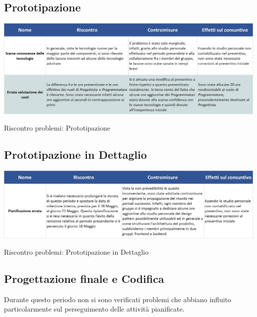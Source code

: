 \subsection{Prototipazione}
\begin{table}[h!]
	\centerline{\includegraphics[scale=0.55]{img/Rischi/RiscontroProblemi-Prototipazione.jpg}}
	\caption{Riscontro problemi: Prototipazione}
\end{table}

\subsection{Prototipazione in Dettaglio} \label{RiscontroPrototipazioneDettaglio}
\begin{table}[h!]
	\centerline{\includegraphics[scale=0.55]{img/Rischi/RiscontroProblemi-PrototipazioneDettaglio.jpg}}
	\caption{Riscontro problemi: Prototipazione in Dettaglio}
\end{table}

\subsection{Progettazione finale e Codifica}
Durante questo periodo non si sono verificati problemi che abbiano influito particolarmente sul perseguimento delle attività pianificate.
